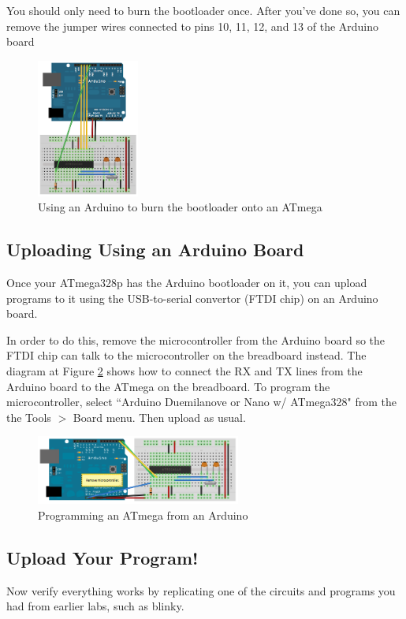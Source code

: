 \documentclass{article}
\begin{document}
You should only need to burn the bootloader once. After you've done so, you can remove the jumper wires connected to pins 10, 11, 12, and 13 of the Arduino board

\begin{figure}[!h]
    \center
    \includegraphics[width=0.3\textwidth,keepaspectratio]{BreadboardAVR}
    \caption{Using an Arduino to burn the bootloader onto an ATmega}
    \label{img:breadBoardAVR}
\end{figure}


\subsection{Uploading Using an Arduino Board}
Once your ATmega328p has the Arduino bootloader on it, you can upload programs to it using the USB-to-serial convertor (FTDI chip) on an Arduino board. \par In order to do this, remove the microcontroller from the Arduino board so the FTDI chip can talk to the microcontroller on the breadboard instead. The diagram at Figure \ref{img:ArduinoUSBSerial} shows how to connect the RX and TX lines from the Arduino board to the ATmega on the breadboard. To program the microcontroller, select ``Arduino Duemilanove or Nano w/ ATmega328" from the the Tools $>$ Board menu. Then upload as usual.

\begin{figure}[!h]
    \center
    \includegraphics[width=0.6\textwidth,keepaspectratio]{ArduinoUSBSerial}
    \caption{Programming an ATmega from an Arduino}
    \label{img:ArduinoUSBSerial}
\end{figure}

\subsection{Upload Your Program!}
Now verify everything works by replicating one of the circuits and programs you had from earlier labs, such as blinky.
\end{document}
